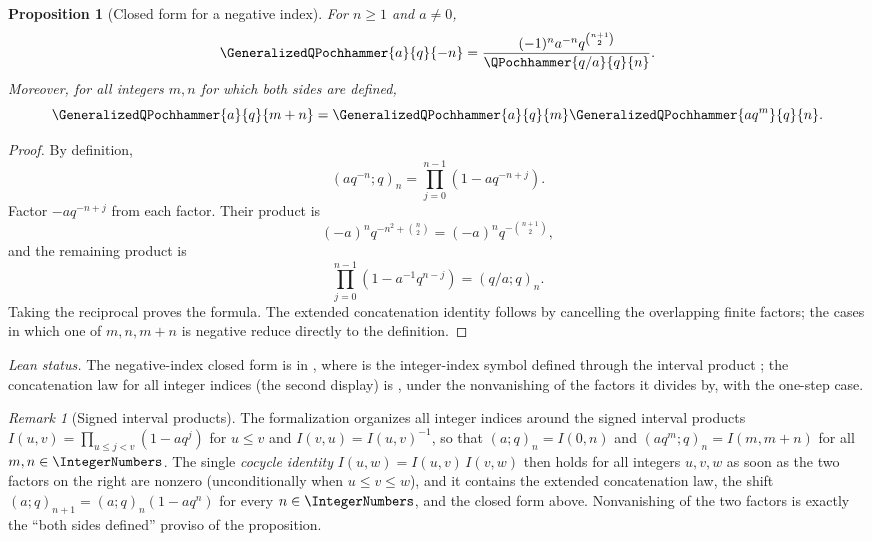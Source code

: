 \documentclass[11pt,a4paper,oneside,openany]{book}
\newtheorem{proposition}[proposition]{Proposition}
\theoremstyle{definition}
\theoremstyle{remark}
\newtheorem{remark}[remark]{Remark}
\begin{document}
\begin{proposition}[Closed form for a negative index]\label{prop:negative-index}
For $n\ge1$ and $a\ne0$,
\[
 \GeneralizedQPochhammer{a}{q}{-n}
 =\frac{(-1)^n a^{-n}q^{\binom{n+1}{2}}}
        {\QPochhammer{q/a}{q}{n}}.
\]
Moreover, for all integers $m,n$ for which both sides are defined,
\[
 \GeneralizedQPochhammer{a}{q}{m+n}
 =\GeneralizedQPochhammer{a}{q}{m}
  \GeneralizedQPochhammer{aq^m}{q}{n}.
\]
\end{proposition}

\begin{proof}
By definition,
\[
 (aq^{-n};q)_n=\prod_{j=0}^{n-1}(1-aq^{-n+j}).
\]
Factor $-a q^{-n+j}$ from each factor.  Their product is
\[
 (-a)^nq^{-n^2+\binom n2}=(-a)^nq^{-\binom{n+1}{2}},
\]
and the remaining product is
\[
 \prod_{j=0}^{n-1}(1-a^{-1}q^{n-j})=(q/a;q)_n.
\]
Taking the reciprocal proves the formula.  The extended concatenation identity follows by cancelling the overlapping finite factors; the cases in which one of $m,n,m+n$ is negative reduce directly to the definition.
\end{proof}

\emph{Lean status.}  The negative-index closed form is
 in ,
where  is the integer-index symbol defined through the
interval product ; the concatenation law for all integer indices
(the second display) is , under the nonvanishing of the
factors it divides by, with  the one-step case.


\begin{remark}[Signed interval products]\label{rem:negative-index-formalization}
The formalization organizes all integer indices around the signed interval
products $I(u,v)=\prod_{u\le j<v}(1-aq^j)$ for $u\le v$ and
$I(v,u)=I(u,v)^{-1}$, so that $(a;q)_n=I(0,n)$ and $(aq^m;q)_n=I(m,m+n)$
for all $m,n\in\IntegerNumbers$.  The single \emph{cocycle identity}
$I(u,w)=I(u,v)\,I(v,w)$ then holds for all integers $u,v,w$ as soon as the
two factors on the right are nonzero (unconditionally when $u\le v\le w$),
and it contains the extended concatenation law, the shift
$(a;q)_{n+1}=(a;q)_n(1-aq^n)$ for every $n\in\IntegerNumbers$, and the
closed form above.  Nonvanishing of the two factors is exactly the
``both sides defined'' proviso of the proposition.
\end{remark}
\end{document}

